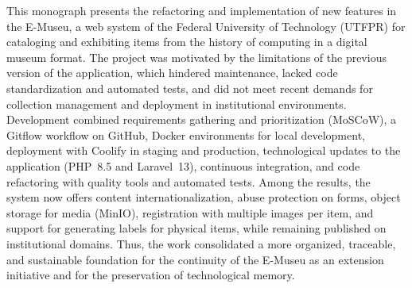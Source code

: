 
\begin{abstractutfpr}
This monograph presents the refactoring and implementation of new features in the E-Museu, a web system of the Federal University of Technology (UTFPR) for cataloging and exhibiting items from the history of computing in a digital museum format. The project was motivated by the limitations of the previous version of the application, which hindered maintenance, lacked code standardization and automated tests, and did not meet recent demands for collection management and deployment in institutional environments. Development combined requirements gathering and prioritization (MoSCoW), a Gitflow workflow on GitHub, Docker environments for local development, deployment with Coolify in staging and production, technological updates to the application (PHP~8.5 and Laravel~13), continuous integration, and code refactoring with quality tools and automated tests. Among the results, the system now offers content internationalization, abuse protection on forms, object storage for media (MinIO), registration with multiple images per item, and support for generating labels for physical items, while remaining published on institutional domains. Thus, the work consolidated a more organized, traceable, and sustainable foundation for the continuity of the E-Museu as an extension initiative and for the preservation of technological memory.
\end{abstractutfpr}
